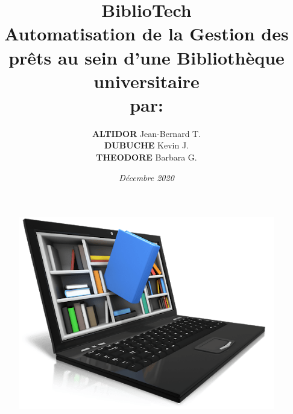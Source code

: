 \documentclass[a4paper,12pt]{report}
\begin{document}
\begin{figure}[!tbp]
    \centering
    \hfill
\end{figure}

\begin{figure}[h]
    \centering
    \includegraphics[width=1\textwidth]{lib}
    \label{image-lib}
\end{figure}


\title{\textbf{BiblioTech} \\ Automatisation de la Gestion des prêts au sein d'une Bibliothèque universitaire \\ par:}
\author{\textbf{ALTIDOR} Jean-Bernard T. \\ \textbf{DUBUCHE} Kevin J. \\ \textbf{THEODORE} Barbara G.}
\date{\textit{Décembre 2020}}
\maketitle
\end{document}
